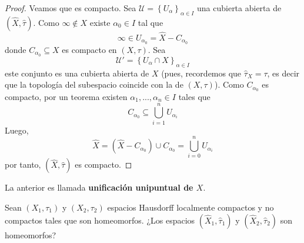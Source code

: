 \documentclass[12pt]{report}
\theoremstyle{largebreak}
\begin{document}
\begin{proof}
        Veamos que es compacto. Sea $\mathcal{U}=\left\{U_\alpha \right\}_{\alpha\in I}$ una cubierta abierta de $(\hat{X},\hat{\tau})$. Como $\infty\notin X$ existe $\alpha_0\in I$ tal que
        \begin{equation*}
            \infty\in U_{\alpha_0}=\hat{X}-C_{\alpha_0}
        \end{equation*}
        donde $C_{\alpha_0}\subseteq X$ es compacto en $(X,\tau)$. Sea
        \begin{equation*}
            \mathcal{U}'=\left\{U_\alpha\cap X \right\}_{\alpha\in I}
        \end{equation*}
        este conjunto es una cubierta abierta de $X$ (pues, recordemos que $\hat{\tau}_X=\tau$, es decir que la topología del subespacio coincide con la de $(X,\tau)$). Como $C_{\alpha_0}$ es compacto, por un teorema existen $\alpha_1,...,\alpha_n\in I$ tales que
        \begin{equation*}
            C_{\alpha_0}\subseteq\bigcup_{ i=1}^n U_{\alpha_i}
        \end{equation*}
        Luego,
        \begin{equation*}
            \hat{X}=(\hat{X}-C_{\alpha_0})\cup C_{\alpha_0}=\bigcup_{ i=0}^n U_{\alpha_i}
        \end{equation*}
        por tanto, $(\hat{X},\hat{\tau})$ es compacto.
    \end{proof}

    La anterior es llamada \textbf{unificación unipuntual de $X$}.

    Sean $(X_1,\tau_1)$ y $(X_2,\tau_2)$ espacios Hausdorff localmente compactos y no compactos tales que son homeomorfos. ¿Los espacios $(\hat{X}_1,\hat{\tau}_1)$ y $(\hat{X}_2,\hat{\tau}_2)$ son homeomorfos?
\end{document}
